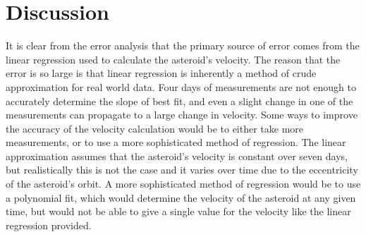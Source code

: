\documentclass{article}
\begin{document}
\section{Discussion}
It is clear from the error analysis that the primary source of error comes from the linear regression used to calculate the asteroid's velocity.
The reason that the error is so large is that linear regression is inherently a method of crude approximation for real world data. Four days of measurements are not enough to accurately
determine the slope of best fit, and even a slight change in one of the measurements can propagate to a large change in velocity. Some ways to improve the accuracy of the velocity calculation would be to 
either take more measurements, or to use a more sophisticated method of regression. The linear approximation assumes that the asteroid's velocity is constant over seven days, but realistically this 
is not the case and it varies over time due to the eccentricity of the asteroid's orbit. A more sophisticated method of regression would be to use a polynomial fit, which would determine the velocity of the asteroid
at any given time, but would not be able to give a single value for the velocity like the linear regression provided. 
\end{document}
